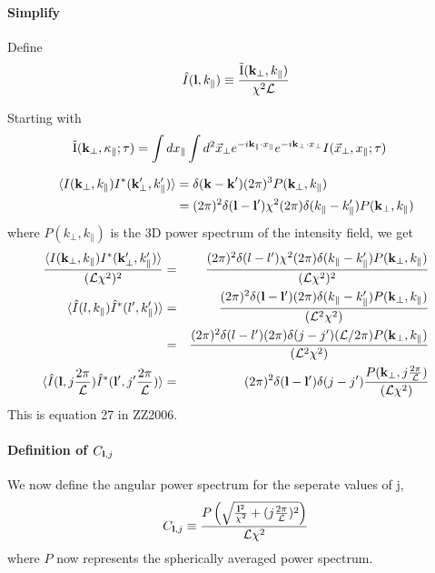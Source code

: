 \documentclass[12pt]{article}
\newcommand{\beq}{\begin{equation}}
\newcommand{\eeq}{\end{equation}}
\newcommand{\beqa}{\begin{eqnarray}}
\newcommand{\eeqa}{\end{eqnarray}}
\newcommand{\beqal}{\begin{aligned}}
\newcommand{\eeqal}{\end{aligned}}
\def\k{{\bf k}}
\def\l{{\bf l}}
\def\il{{\tilde{\rm I}}}
\numberwithin{equation}{section}
\begin{document}
\paragraph{Simplify}
Define
\beqa
\hat{I} (\l, k_\parallel) \equiv \frac{\il(\k_\perp, k_\parallel)}{\chi^2\mathcal{L}}
\eeqa

Starting with
\beq
\beqal
\il(\k_\perp,\kappa_\parallel ; \tau) &= \int dx_\parallel \int d^2\vec{x}_\perp e^{-i \k_\parallel \cdot x_\parallel} e^{-i \k_\perp \cdot x_\perp} I(\vec{x}_\perp, x_\parallel; \tau) \label{eq:foreman1}
\eeqal
\eeq

\beq
\beqal
\langle I(\k_\perp, k_\parallel) I^*(\k_\perp', k_\parallel')   \rangle &= \delta(\textbf{k} - \textbf{k}') (2\pi)^3 P(\k_\perp, k_\parallel)
\\
&= (2\pi)^2 \delta(\l - \l') \chi^2 (2\pi) \delta(k_\parallel - k'_\parallel) P(\k_\perp, k_\parallel) \label{eq:3dcorr}
\eeqal
\eeq
where  $ P(k_\perp, k_\parallel) $ is the 3D power spectrum of the intensity field, we get
\beqa
\frac{\langle I(\k_\perp, k_\parallel) I^*(\k_\perp', k_\parallel')   \rangle}{(\mathcal{L} \chi^2)^2} &=& \frac{(2\pi)^2 \delta(l - l') \chi^2 (2\pi) \delta(k_\parallel - k'_\parallel) P(\k_\perp, k_\parallel) }{(\mathcal{L} \chi^2)^2}
\\
\langle \hat{I}(l, k_\parallel) \hat{I}^*(l', k_\parallel')   \rangle &=& \frac{(2\pi)^2 \delta(\l - \l')  (2\pi) \delta(k_\parallel - k'_\parallel) P(\k_\perp, k_\parallel) }{(\mathcal{L}^2 \chi^2)}
\\
&=& \frac{(2\pi)^2 \delta(l - l')  (2\pi) \delta(j - j') (\mathcal{L}/2\pi) P(\k_\perp, k_\parallel) }{(\mathcal{L}^2 \chi^2)}
\\
\langle \hat{I}(\l, j \frac{2\pi}{\mathcal{L}}) \hat{I}^*(\l', j'\frac{2\pi}{\mathcal{L}})   \rangle  &=& (2\pi)^2 \delta(\l - \l') \delta(j - j')  \frac{P(\k_\perp, j\frac{2\pi}{\mathcal{L}}) }{(\mathcal{L} \chi^2)}
\eeqa
This is equation 27 in ZZ2006.

\paragraph{Definition of $ C_{\l,j} $}
We now define the angular power spectrum for the seperate values of j, 
\beqa
C_{\l,j} \equiv \frac{P \left( \sqrt{\frac{\l^2}{\chi^2} + (j\frac{2\pi}{\mathcal{L}})^2} \right)}{\mathcal{L} \chi^2}
\eeqa
where $ P $ now represents the spherically averaged power spectrum.
\end{document}
